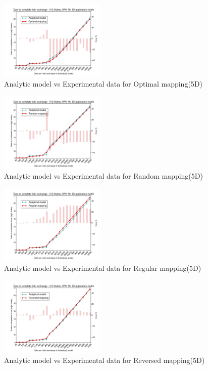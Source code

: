 \documentclass{acm_proc_article-sp}
\begin{document}
\begin{figure}
  \center
  \includegraphics[width=0.45\textwidth]{mappings/5d_optimal_model.png}
  \caption{Analytic model vs Experimental data for Optimal mapping(5D)}
    \label{fig:5D_optimal_mapping}
\end{figure}

\begin{figure}
  \center
  \includegraphics[width=0.45\textwidth]{mappings/5d_random_model.png}
  \caption{Analytic model vs Experimental data for Random mapping(5D)}
    \label{fig:5D_random_mapping}
\end{figure}

\begin{figure}
  \center
  \includegraphics[width=0.45\textwidth]{mappings/5d_regular_model.png}
  \caption{Analytic model vs Experimental data for Regular mapping(5D)}
    \label{fig:5D_regular_mapping}
\end{figure}

\begin{figure}
  \center
  \includegraphics[width=0.45\textwidth]{mappings/5d_reversed_model.png}
  \caption{Analytic model vs Experimental data for Reversed mapping(5D)}
    \label{fig:5D_reversed_mapping}
\end{figure}
\end{document}

